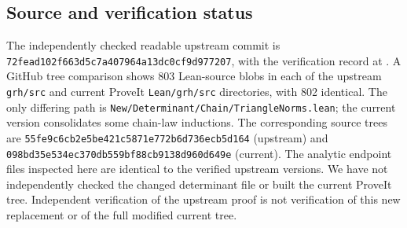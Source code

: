 \documentclass[11pt]{article}
\theoremstyle{remark}\newtheorem{remark}[theorem]{Remark}
\begin{document}
\subsection*{Source and verification status}
The independently checked readable upstream commit is \texttt{72fead102f663d5c7a40}\allowbreak\texttt{7964a13dc0cf9d977207}, with the verification record at \cite{Suth}. A GitHub tree comparison shows 803 Lean-source blobs in each of the upstream \texttt{grh/src} and current ProveIt \texttt{Lean/grh/src} directories, with 802 identical. The only differing path is \texttt{New/Determinant/Chain/TriangleNorms.lean}; the current version consolidates some chain-law inductions. The corresponding source trees are \texttt{55fe9c6cb2e5be421c58}\allowbreak\texttt{71e772b6d736ecb5d164} (upstream) and \texttt{098bd35e534ec370db55}\allowbreak\texttt{9bf88cb9138d960d649e} (current). The analytic endpoint files inspected here are identical to the verified upstream versions. We have not independently checked the changed determinant file or built the current ProveIt tree. Independent verification of the upstream proof is not verification of this new replacement or of the full modified current tree.
\end{document}

